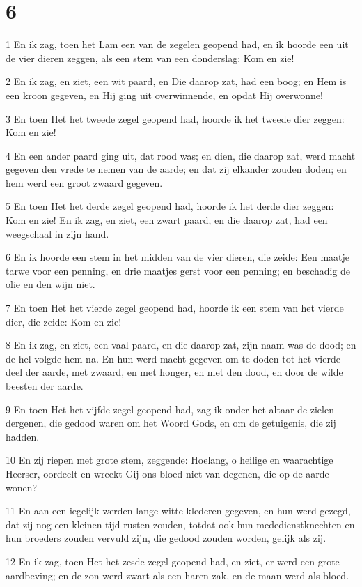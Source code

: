 \chapter{6}

\par 1 En ik zag, toen het Lam een van de zegelen geopend had, en ik hoorde een uit de vier dieren zeggen, als een stem van een donderslag: Kom en zie!
\par 2 En ik zag, en ziet, een wit paard, en Die daarop zat, had een boog; en Hem is een kroon gegeven, en Hij ging uit overwinnende, en opdat Hij overwonne!
\par 3 En toen Het het tweede zegel geopend had, hoorde ik het tweede dier zeggen: Kom en zie!
\par 4 En een ander paard ging uit, dat rood was; en dien, die daarop zat, werd macht gegeven den vrede te nemen van de aarde; en dat zij elkander zouden doden; en hem werd een groot zwaard gegeven.
\par 5 En toen Het het derde zegel geopend had, hoorde ik het derde dier zeggen: Kom en zie! En ik zag, en ziet, een zwart paard, en die daarop zat, had een weegschaal in zijn hand.
\par 6 En ik hoorde een stem in het midden van de vier dieren, die zeide: Een maatje tarwe voor een penning, en drie maatjes gerst voor een penning; en beschadig de olie en den wijn niet.
\par 7 En toen Het het vierde zegel geopend had, hoorde ik een stem van het vierde dier, die zeide: Kom en zie!
\par 8 En ik zag, en ziet, een vaal paard, en die daarop zat, zijn naam was de dood; en de hel volgde hem na. En hun werd macht gegeven om te doden tot het vierde deel der aarde, met zwaard, en met honger, en met den dood, en door de wilde beesten der aarde.
\par 9 En toen Het het vijfde zegel geopend had, zag ik onder het altaar de zielen dergenen, die gedood waren om het Woord Gods, en om de getuigenis, die zij hadden.
\par 10 En zij riepen met grote stem, zeggende: Hoelang, o heilige en waarachtige Heerser, oordeelt en wreekt Gij ons bloed niet van degenen, die op de aarde wonen?
\par 11 En aan een iegelijk werden lange witte klederen gegeven, en hun werd gezegd, dat zij nog een kleinen tijd rusten zouden, totdat ook hun mededienstknechten en hun broeders zouden vervuld zijn, die gedood zouden worden, gelijk als zij.
\par 12 En ik zag, toen Het het zesde zegel geopend had, en ziet, er werd een grote aardbeving; en de zon werd zwart als een haren zak, en de maan werd als bloed.
